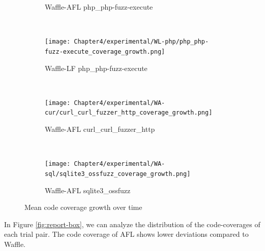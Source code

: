 \begin{figure}[!t]
\begin{adjustbox}{center,max width=1.3\textwidth}
\begin{subfigure}[t]{0.55\textwidth}
            \vspace*{-5mm}
            \caption{Waffle-AFL php\_php-fuzz-execute}
            \label{gro:c}
            \vspace*{5mm}
        \end{subfigure}
        ~
        \begin{subfigure}[t]{0.55\textwidth}
            \centering
            \texttt{[image: Chapter4/experimental/WL-php/php\_php-fuzz-execute\_coverage\_growth.png]}
            \vspace*{-5mm}
            \caption{Waffle-LF php\_php-fuzz-execute}
            \label{gro:g}
            \vspace*{5mm}
        \end{subfigure}
    \end{adjustbox}
    ~
    \begin{adjustbox}{center,max width=1.3\textwidth}
        \begin{subfigure}[t]{0.55\textwidth}
            \centering
            \texttt{[image: Chapter4/experimental/WA-cur/curl\_curl\_fuzzer\_http\_coverage\_growth.png]}
            \vspace*{-5mm}
            \caption{Waffle-AFL curl\_curl\_fuzzer\_http}
            \label{gro:a}
            \vspace*{5mm}
        \end{subfigure}
        ~
        \begin{subfigure}[t]{0.55\textwidth}
            \centering
            \texttt{[image: Chapter4/experimental/WA-sql/sqlite3\_ossfuzz\_coverage\_growth.png]}
            \vspace*{-5mm}
            \caption{Waffle-AFL sqlite3\_ossfuzz}
            \label{gro:d}
            \vspace*{5mm}
        \end{subfigure}
    \end{adjustbox}
    \caption{Mean code coverage growth over time}
    \label{fig:report-log}
\end{figure}

In Figure \ref{fig:report-box}, we can analyze the distribution of the code-coverages of each trial pair. The code coverage of AFL shows lower deviations compared to Waffle.

